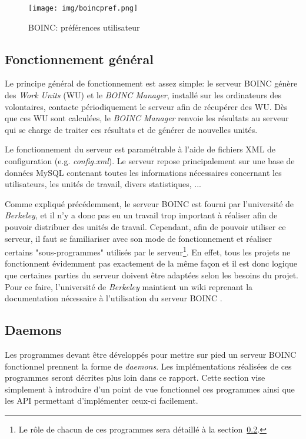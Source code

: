 \documentclass[a4paper, 11pt]{article}
\begin{document}
\begin{figure}[!h]
\centering
\texttt{[image: img/boincpref.png]}
\caption{\textsc{BOINC}: préférences utilisateur}
\label{boincpref}
\end{figure}

\subsection{Fonctionnement général}
Le principe général de fonctionnement est assez simple: le serveur \textsc{BOINC} génère des \textit{Work Units} (WU) et le \textit{BOINC Manager}, installé sur les ordinateurs des volontaires, contacte périodiquement le serveur afin de récupérer des WU. Dès que ces WU sont calculées, le \textit{BOINC Manager} renvoie les résultats au serveur qui se charge de traiter ces résultats et de générer de nouvelles unités. 

Le fonctionnement du serveur est paramétrable à l'aide de fichiers XML de configuration (e.g. \textit{config.xml}). Le serveur repose principalement sur une base de données MySQL contenant toutes les informations nécessaires concernant les utilisateurs, les unités de travail, divers statistiques, ...

Comme expliqué précédemment, le serveur \textsc{BOINC} est fourni par l'université de \textit{Berkeley}, et il n'y a donc pas eu un travail trop important à réaliser afin de pouvoir distribuer des unités de travail. Cependant, afin de pouvoir utiliser ce serveur, il faut se familiariser avec son mode de fonctionnement et réaliser certains "sous-programmes" utilisés par le serveur\footnote{Le rôle de chacun de ces programmes sera détaillé à la section~\ref{daemons}.}.
En effet, tous les projets ne fonctionnent évidemment pas exactement de la même façon et il est donc logique que certaines parties du serveur doivent être adaptées selon les besoins du projet. Pour ce faire, l'université de \textit{Berkeley} maintient un wiki reprenant la documentation nécessaire à l'utilisation du serveur \textsc{BOINC} \cite{WIKI}.

\subsection{Daemons}
\label{daemons}
Les programmes devant être développés pour mettre sur pied un serveur \textsc{BOINC} fonctionnel prennent la forme de \textit{daemons}. Les implémentations réalisées de ces programmes seront décrites plus loin dans ce rapport. Cette section vise simplement à introduire d'un point de vue fonctionnel ces programmes ainsi que les API permettant d'implémenter ceux-ci facilement.
\end{document}
